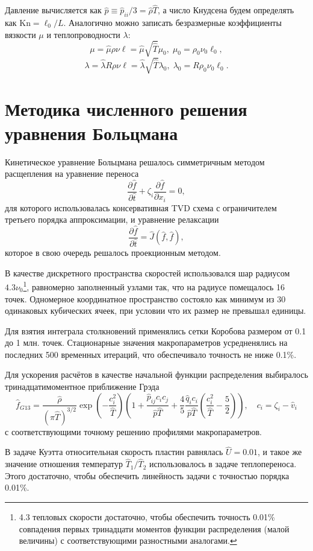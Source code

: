\documentclass[english,russian,a4paper,12pt]{article}
\newcommand{\Kn}{\mathrm{Kn}}
\begin{document}
Давление вычисляется как \(\hat{p} \equiv \hat{p}_{ii}/3 = \hat{\rho}\hat{T}\), а число Кнудсена будем определять как \(\Kn=\ell_0/L\).
Аналогично можно записать безразмерные коэффициенты вязкости \(\mu\) и теплопроводности \(\lambda\):
\[ \mu = \hat{\mu}\rho\nu\ell = \hat{\mu}\sqrt{\hat{T}}\mu_0, \; \mu_0 = \rho_0\nu_0\ell_0, \]
\[ \lambda = \hat{\lambda}R\rho\nu\ell = \hat{\lambda}\sqrt{\hat{T}}\lambda_0, \; \lambda_0 = R\rho_0\nu_0\ell_0. \]

\section{Методика численного решения уравнения Больцмана}

Кинетическое уравнение Больцмана решалось симметричным методом расщепления на уравнение переноса
\[ \frac{\partial\hat{f}}{\partial\hat{t}} + \zeta_i\frac{\partial\hat{f}}{\partial x_i} = 0, \]
для которого использовалась консервативная TVD схема с ограничителем третьего порядка аппроксимации,
и уравнение релаксации
\[ \frac{\partial\hat{f}}{\partial\hat{t}} = \hat{J}(\hat{f},\hat{f}), \]
которое в свою очередь решалось проекционным методом.

В качестве дискретного пространства скоростей использовался шар радиусом \(4.3\nu_0\)\footnote
{
    4.3 тепловых скорости достаточно, чтобы обеспечить точность 0.01\% совпадения
    первых тринадцати моментов функции распределения (малой величины) с соответствующими разностными аналогами.
},
равномерно заполненный узлами так, что на радиусе помещалось 16 точек.
Одномерное координатное пространство состояло как минимум из 30 одинаковых кубических ячеек,
при условии что их размер не превышал единицы.

Для взятия интеграла столкновений применялись сетки Коробова размером от 0.1 до 1 млн. точек.
Стационарные значения макропараметров усредненялись на последних 500 временных итераций,
что обеспечивало точность не ниже 0.1\%.

Для ускорения расчётов в качестве начальной функции распределения выбиралось тринадцатимоментное приближение Грэда
\[
    \hat{f}_{G13} = \frac{\hat\rho}{(\pi\hat T)^{3/2}}\exp\left(-\frac{c_i^2}{\hat T}\right)
    \left( 1+\frac{\hat p_{ij}c_ic_j}{\hat p\hat T} + \frac4{5}\frac{\hat q_ic_i}{\hat p\hat T}\left(\frac{c_i^2}{\hat T}-\frac5{2}\right) \right),
    \quad c_i = \zeta_i - \hat v_i
\]
с соответствующими точному решению профилями макропараметров.

В задаче Куэтта относительная скорость пластин равнялась \(\hat{U}=0.01\),
и такое же значение отношения температур \(\hat{T}_1/\hat{T}_2\) использовалось в задаче теплопереноса.
Этого достаточно, чтобы обеспечить линейность задачи с точностью порядка 0.01\%.
\end{document}
